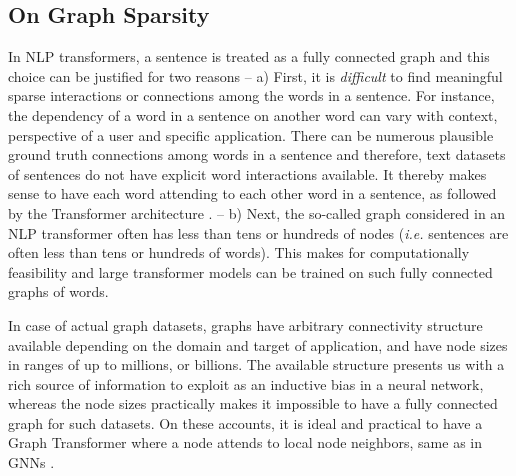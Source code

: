 \documentclass[letterpaper]{article} %
\begin{document}
\subsection{On Graph Sparsity} In NLP transformers, a sentence is treated as a fully connected graph and this choice can be justified for two reasons -- a) First, it is \textit{difficult} to find meaningful sparse interactions or connections among the words in a sentence. For instance, the dependency of a word in a sentence on another word can vary with context, perspective of a user and specific application. There can be numerous plausible ground truth connections among words in a sentence and therefore, text datasets of sentences do not have explicit word interactions available. It thereby makes sense to have each word attending to each other word in a sentence, as followed by the Transformer architecture \cite{vaswani2017attention}.
-- b) Next, the so-called graph considered in an NLP transformer often has less than tens or hundreds of nodes (\textit{i.e.} sentences are often less than tens or hundreds of words). This makes for computationally feasibility and large transformer models can be trained on such fully connected graphs of words. 

In case of actual graph datasets, graphs have arbitrary connectivity structure available depending on the domain and target of application, and have node sizes in ranges of up to millions, or billions. The available structure presents us with a rich source of information to exploit as an inductive bias in a neural network, whereas the node sizes practically makes it impossible to have a fully connected graph for such datasets. On these accounts, it is ideal and practical to have a Graph Transformer where a node attends to local node neighbors, same as in GNNs \cite{NIPS2016_6081, kipf2017semi, Monti_2017, gilmer2017neural, velickovic2018graph, bresson2017residual, xu2018how}.
\end{document}

